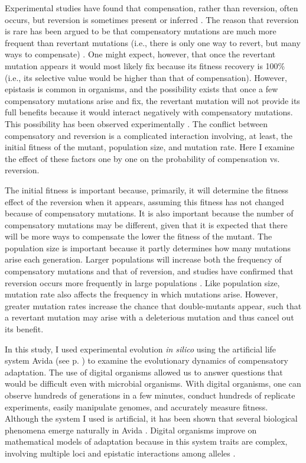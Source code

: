 \begin{doublespace}
Experimental studies have found that compensation, rather than reversion,
often occurs, but reversion is sometimes present or inferred
\citep{bur99,san05,mai02}.
%
The reason that reversion is rare has been argued to be that
compensatory mutations are much more frequent than revertant mutations
(i.e., there is only one way to revert, but many ways to compensate)
\citep{lev00,whi03,san05}.
%
One might expect, however, that once the revertant mutation appears
it would most likely fix because its fitness recovery is 100\%
(i.e., its selective value would be higher than that of compensation).
%
However, epistasis is common in organisms, and the possibility
exists that once a few compensatory mutations arise and fix,
the revertant mutation will not provide its full benefits because
it would interact negatively with compensatory mutations.
%
This possibility has been observed experimentally \citep{sch97,lev00}.
%
The conflict between compensatory and reversion is a complicated
interaction involving, at least, the initial fitness of the mutant,
population size, and mutation rate.
%
Here I examine the effect of these factors one by one
on the probability of compensation vs. reversion.



The initial fitness is important because, primarily, it will determine
the fitness effect of the reversion when it appears,
assuming this fitness has not changed because of compensatory mutations.
%
It is also important because the number of compensatory mutations
may be different, given that it is expected that there will be more ways
to compensate the lower the fitness of the mutant.
%
The population size is important because it partly determines
how many mutations arise each generation.
%
Larger populations will increase both the frequency of compensatory mutations
and that of reversion, and studies have confirmed
that reversion occurs more frequently in large populations \citep{bur99}.
%
Like population size, mutation rate also affects the frequency
in which mutations arise.
%
However, greater mutation rates increase the chance that double-mutants appear,
such that a revertant mutation may arise with a deleterious mutation
and thus cancel out its benefit.



In this study, I used experimental evolution \emph{in silico}
using the artificial life system Avida \citep{ofr04}
(see p. \pageref{sec:avida})
to examine the evolutionary dynamics of compensatory adaptation.
%
The use of digital organisms allowed us to answer questions
that would be difficult even with microbial organisms.
%
With digital organisms,
one can observe hundreds of generations in a few minutes,
conduct hundreds of replicate experiments,
easily manipulate genomes,
and accurately measure fitness.
%
Although the system I used is artificial, it has been shown that
several biological phenomena emerge naturally in Avida \citep{wil02,ada06}.
%
Digital organisms improve on mathematical models of adaptation
because in this system traits are complex,
involving multiple loci and epistatic interactions among alleles \citep{len99}.




\end{doublespace}
